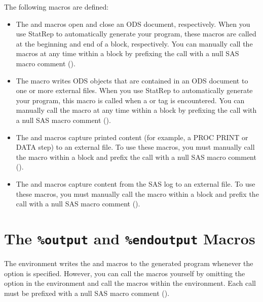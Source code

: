 \documentclass[article,oneside]{memoir}
\newcommand*{\StatRep}{\textsf{StatRep}\xspace}
\begin{document}
  The following macros are defined:
  \begin{itemize}
  \item The  and  macros open and close an ODS document, respectively.
  When you use \StatRep to automatically generate your program, these macros are called at the
  beginning and end of a  block, respectively.
  You can manually call the macros at any time within
  a  block by prefixing the call with a null SAS macro comment (\Code{\%*;}).

  \item The   macro writes ODS objects that are contained in an ODS document to
  one or more external files.
  When you use \StatRep to automatically generate your program, this macro is called when
  a  or  tag is encountered. You can manually call the macro
  at any time within a  block by prefixing the call with a null
  SAS macro comment (\Code{\%*;}).

  \item The  and  macros capture printed content
  (for example, a PROC PRINT or DATA step) to an external file. To use these macros,
  you must manually call the macro
  within a  block and prefix the call with a null
  SAS macro comment (\Code{\%*;}).

  \item The  and  macros capture content from the
  SAS log to an external file. To use these macros,
  you must manually call the macro
  within a  block and prefix the call with a null
  SAS macro comment (\Code{\%*;}).
  \end{itemize}


  \section{The \texttt{\%output} and \texttt{\%endoutput} Macros}\label{outputmacro}
  The  environment writes the  and  macros to
  the generated program
  whenever the  option is specified.
  However, you can call the macros
  yourself by omitting the  option in the  environment and
  call the macros within the  environment. Each call must be prefixed
  with a null SAS macro comment (\Code{\%*;}).
\end{document}
